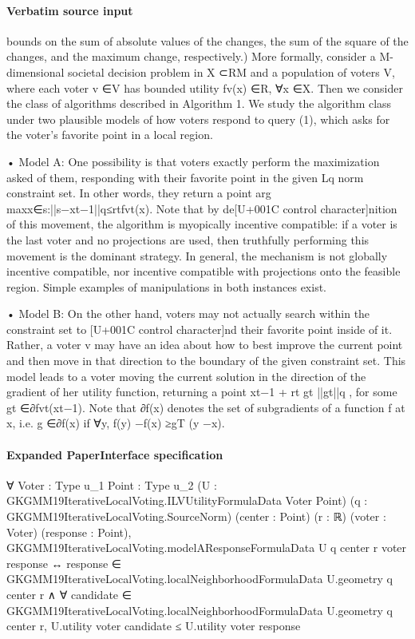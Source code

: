 \documentclass[10pt]{article}
\begin{document}
\paragraph{Verbatim source input}
\begin{ReviewVerbatim}
bounds on the sum of absolute values of the changes, the sum of the square of the changes,
and the maximum change, respectively.)
More formally, consider a M-dimensional societal decision problem in X ⊂RM and a
population of voters V, where each voter v ∈V has bounded utility fv(x) ∈R, ∀x ∈X.
Then we consider the class of algorithms described in Algorithm 1. We study the algorithm
class under two plausible models of how voters respond to query (1), which asks for the
voter's favorite point in a local region.

• Model A:
One possibility is that voters exactly perform the maximization asked of
them, responding with their favorite point in the given Lq norm constraint set. In other
words, they return a point arg maxx∈{s:||s−xt−1||q≤rt}fvt(x). Note that by de[U+001C control character]nition of this
movement, the algorithm is myopically incentive compatible: if a voter is the last voter
and no projections are used, then truthfully performing this movement is the dominant
strategy. In general, the mechanism is not globally incentive compatible, nor incentive
compatible with projections onto the feasible region. Simple examples of manipulations
in both instances exist.

• Model B: On the other hand, voters may not actually search within the constraint set
to [U+001C control character]nd their favorite point inside of it. Rather, a voter v may have an idea about how
to best improve the current point and then move in that direction to the boundary of
the given constraint set. This model leads to a voter moving the current solution in the
direction of the gradient of her utility function, returning a point xt−1 + rt
gt
||gt||q , for some
gt ∈∂fvt(xt−1). Note that ∂f(x) denotes the set of subgradients of a function f at x, i.e.
g ∈∂f(x) if ∀y, f(y) −f(x) ≥gT (y −x).
\end{ReviewVerbatim}


\paragraph{Expanded PaperInterface specification}
\begin{ReviewVerbatim}
∀ {Voter : Type u_1} {Point : Type u_2} (U : GKGMM19IterativeLocalVoting.ILVUtilityFormulaData Voter Point)
  (q : GKGMM19IterativeLocalVoting.SourceNorm) (center : Point) (r : ℝ) (voter : Voter) (response : Point),
  GKGMM19IterativeLocalVoting.modelAResponseFormulaData U q center r voter response ↔
    response ∈ GKGMM19IterativeLocalVoting.localNeighborhoodFormulaData U.geometry q center r ∧
      ∀ candidate ∈ GKGMM19IterativeLocalVoting.localNeighborhoodFormulaData U.geometry q center r,
        U.utility voter candidate ≤ U.utility voter response
\end{ReviewVerbatim}
\end{document}
